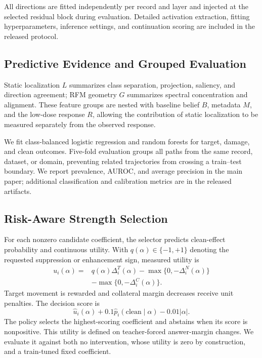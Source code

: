 All directions are fitted independently per record and layer and injected at
the selected residual block during evaluation. Detailed activation extraction,
fitting hyperparameters, inference settings, and continuation scoring are
included in the released protocol.

\subsection{Predictive Evidence and Grouped Evaluation}

Static localization $L$ summarizes class separation, projection, saliency, and
direction agreement; RFM geometry $G$ summarizes spectral concentration and
alignment. These feature groups are nested with baseline belief $B$, metadata
$M$, and the low-dose response $R$, allowing the contribution of static
localization to be measured separately from the observed response.

We fit class-balanced logistic regression and random forests for target,
damage, and clean outcomes. Five-fold evaluation groups all paths from the same
record, dataset, or domain, preventing related trajectories from crossing a
train--test boundary. We report prevalence, AUROC, and average precision in the
main paper;
additional classification and calibration metrics are in the released
artifacts.

\subsection{Risk-Aware Strength Selection}

For each nonzero candidate coefficient, the selector predicts clean-effect
probability and continuous utility. With $q(\alpha)\in\{-1,+1\}$ denoting the
requested suppression or enhancement sign, measured utility is
\begin{equation}
\begin{aligned}
    u_i(\alpha)={}&q(\alpha)\Delta^T_i(\alpha)
    -\max\{0,-\Delta^N_i(\alpha)\}\\
    &-\max\{0,-\Delta^C_i(\alpha)\}.
\end{aligned}
\end{equation}
Target movement is rewarded and collateral margin decreases receive unit
penalties. The decision score is
\begin{equation}
    \widehat{u}_i(\alpha)+0.1\widehat{p}_i(\mathrm{clean}\mid\alpha)
    -0.01|\alpha|.
\end{equation}
The policy selects the highest-scoring coefficient and abstains when its score
is nonpositive. This utility is defined on teacher-forced answer-margin changes.
We evaluate it against both no intervention,
whose utility is zero by construction, and a train-tuned fixed coefficient.
